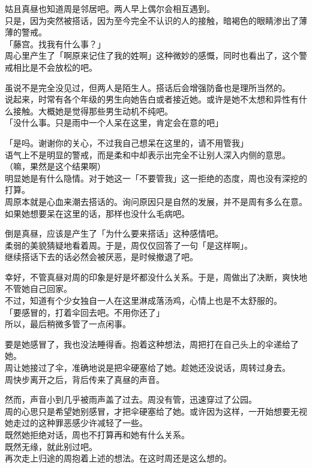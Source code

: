 姑且真昼也知道周是邻居吧。两人早上偶尔会相互遇到。\\

只是，因为突然被搭话，因为至今完全不认识的人的接触，暗褐色的眼睛渗出了薄薄的警戒。\\

「藤宫。找我有什么事？」\\

周心里产生了「啊原来记住了我的姓啊」这种微妙的感慨，同时也看出了，这个警戒相比是不会放松的吧。

虽说不是完全没见过，但两人是陌生人。搭话后会增强防备也是理所当然的。\\

说起来，时常有各个年级的男生向她告白或者接近她。或许是她不太想和异性有什么接触。大概她是觉得那些男生动机不纯吧。\\

「没什么事。只是雨中一个人呆在这里，肯定会在意的吧」

「是吗。谢谢你的关心，不过我自己想呆在这里的，请不用管我」\\

语气上不是明显的警戒，而是柔和中却表示出完全不让别人深入内侧的意思。\\

（嘛，果然是这个结果啊）\\

明显她是有什么隐情。对于她这一「不要管我」这一拒绝的态度，周也没有深挖的打算。\\

周原本就是心血来潮去搭话的。询问原因只是自然的发展，并不是周有多么在意。\\

如果她想要呆在这里的话，那样也没什么毛病吧。

倒是真昼，应该是产生了「为什么要来搭话」这种感情吧。\\

柔弱的美貌猜疑地看着周。于是，周仅仅回答了一句「是这样啊」。\\

继续搭话下去的话必然会被厌恶，是时候撤退了吧。

幸好，不管真昼对周的印象是好是坏都没什么关系。于是，周做出了决断，爽快地不管她自己回家。\\

不过，知道有个少女独自一人在这里淋成落汤鸡，心情上也是不太舒服的。\\

「要感冒的，打着伞回去吧。不用你还了」\\

所以，最后稍微多管了一点闲事。

要是她感冒了，我也没法睡得香。抱着这种想法，周把打在自己头上的伞递给了她。\\

周让她接过了伞，准确地说是把伞硬塞给了她。趁她还没说话，周转过身去。\\

周快步离开之后，背后传来了真昼的声音。

然而，声音小到几乎被雨声盖了过去。周没有管，迅速穿过了公园。\\

周的心思只是希望她别感冒，才把伞硬塞给了她。或许因为这样，一开始想要无视她走过的这种罪恶感少许减轻了一些。\\

既然她拒绝对话，周也不打算再和她有什么关系。\\

既然无缘，就此别过吧。\\

再次走上归途的周抱着上述的想法。在这时周还是这么想的。

